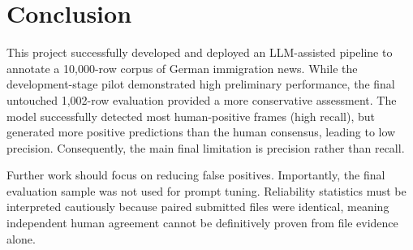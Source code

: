 
\section{Conclusion}
\label{sec:conclusion}

This project successfully developed and deployed an LLM-assisted pipeline to annotate a 10,000-row corpus of German immigration news. While the development-stage pilot demonstrated high preliminary performance, the final untouched 1,002-row evaluation provided a more conservative assessment. The model successfully detected most human-positive frames (high recall), but generated more positive predictions than the human consensus, leading to low precision. Consequently, the main final limitation is precision rather than recall. 

Further work should focus on reducing false positives. Importantly, the final evaluation sample was not used for prompt tuning. Reliability statistics must be interpreted cautiously because paired submitted files were identical, meaning independent human agreement cannot be definitively proven from file evidence alone.
